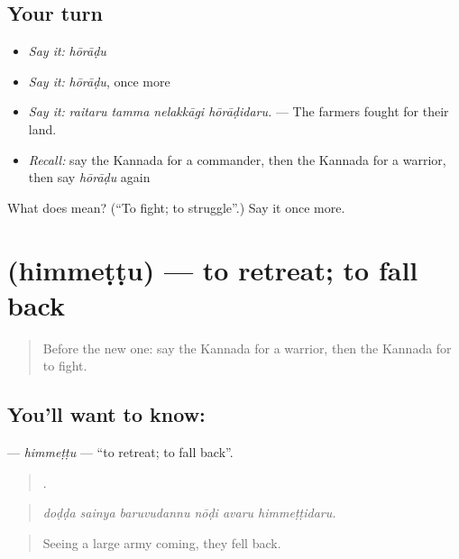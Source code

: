 \subsection*{Your turn}
\begin{itemize}
\raggedright
  \item \emph{Say it:} \emph{hōrāḍu}
  \item \emph{Say it:} \emph{hōrāḍu}, once more
  \item \emph{Say it:} \emph{raitaru tamma nelakkāgi hōrāḍidaru.} — The farmers fought for their land.
  \item \emph{Recall:} say the Kannada for a commander, then the Kannada for a warrior, then say \emph{hōrāḍu} again
\end{itemize}

\begin{tcolorbox}[breakable,colback=teal!4,colframe=teal!35!black,title={Before you move on}]
What does  mean? (\textquotedblleft{}To fight; to struggle\textquotedblright{}.) Say it once more.
\end{tcolorbox}
\section[\texorpdfstring{\kn{ಹಿಮ್ಮೆಟ್ಟು} (himmeṭṭu)}{ಹಿಮ್ಮೆಟ್ಟು (himmeṭṭu)}]{ (himmeṭṭu) — to retreat; to fall back}

\label{lesson:KA-C336-himmettu}



\begin{quote}
Before the new one: say the Kannada for a warrior, then the Kannada for to fight.
\end{quote}

\subsection*{You'll want to know: }
\textbf{} — \emph{himmeṭṭu} — \textquotedblleft{}to retreat; to fall back\textquotedblright{}.

\begin{quote}
     .
\end{quote}

\begin{quote}
\emph{doḍḍa sainya baruvudannu nōḍi avaru himmeṭṭidaru.}
\end{quote}

\begin{quote}
Seeing a large army coming, they fell back.
\end{quote}

